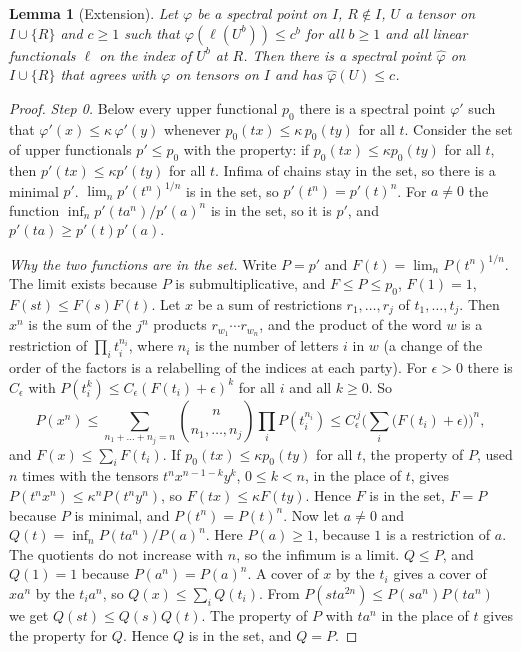 \documentclass[11pt]{article}
\newtheorem{lemma}[theorem]{Lemma}
\theoremstyle{definition}
\begin{document}
\begin{lemma}[Extension]\label{lem:ext}
Let $\varphi$ be a spectral point on $I$, $R\notin I$, $U$ a tensor on $I\cup\{R\}$ and $c\ge1$ such that $\varphi(\ell(U^b))\le c^b$ for all $b\ge1$ and all linear functionals $\ell$ on the index of $U^b$ at $R$. Then there is a spectral point $\hat\varphi$ on $I\cup\{R\}$ that agrees with $\varphi$ on tensors on $I$ and has $\hat\varphi(U)\le c$.
\end{lemma}
\begin{proof}
\emph{Step 0.} Below every upper functional $p_0$ there is a spectral point $\varphi'$ such that $\varphi'(x)\le\kappa\,\varphi'(y)$ whenever $p_0(tx)\le\kappa\,p_0(ty)$ for all $t$. Consider the set of upper functionals $p'\le p_0$ with the property: if $p_0(tx)\le\kappa p_0(ty)$ for all $t$, then $p'(tx)\le\kappa p'(ty)$ for all $t$. Infima of chains stay in the set, so there is a minimal $p'$.
$\lim_np'(t^n)^{1/n}$ is in the set, so $p'(t^n)=p'(t)^n$. For $a\ne0$ the function $\inf_np'(ta^n)/p'(a)^n$ is in the set, so it is $p'$, and $p'(ta)\ge p'(t)p'(a)$.

\emph{Why the two functions are in the set.} Write $P=p'$ and $F(t)=\lim_nP(t^n)^{1/n}$. The limit exists because $P$ is submultiplicative, and $F\le P\le p_0$, $F(1)=1$, $F(st)\le F(s)F(t)$.
Let $x$ be a sum of restrictions $r_1,\dots,r_j$ of $t_1,\dots,t_j$. Then $x^n$ is the sum of the $j^n$ products $r_{w_1}\cdots r_{w_n}$, and the product of the word $w$ is a restriction of $\prod_it_i^{n_i}$, where $n_i$ is the number of letters $i$ in $w$ (a change of the order of the factors is a relabelling of the indices at each party).
For $\epsilon>0$ there is $C_\epsilon$ with $P(t_i^k)\le C_\epsilon(F(t_i)+\epsilon)^k$ for all $i$ and all $k\ge0$. So
\[
P(x^n)\le\sum_{n_1+\dots+n_j=n}\binom n{n_1,\dots,n_j}\prod_iP(t_i^{n_i})\le C_\epsilon^{\,j}\Big(\sum_i\big(F(t_i)+\epsilon\big)\Big)^n ,
\]
and $F(x)\le\sum_iF(t_i)$. If $p_0(tx)\le\kappa p_0(ty)$ for all $t$, the property of $P$, used $n$ times with the tensors $t^nx^{n-1-k}y^k$, $0\le k<n$, in the place of $t$, gives $P(t^nx^n)\le\kappa^nP(t^ny^n)$, so $F(tx)\le\kappa F(ty)$. Hence $F$ is in the set, $F=P$ because $P$ is minimal, and $P(t^n)=P(t)^n$.
Now let $a\ne0$ and $Q(t)=\inf_nP(ta^n)/P(a)^n$. Here $P(a)\ge1$, because $1$ is a restriction of $a$. The quotients do not increase with $n$, so the infimum is a limit. $Q\le P$, and $Q(1)=1$ because $P(a^n)=P(a)^n$. A cover of $x$ by the $t_i$ gives a cover of $xa^n$ by the $t_ia^n$, so $Q(x)\le\sum_iQ(t_i)$. From $P(sta^{2n})\le P(sa^n)P(ta^n)$ we get $Q(st)\le Q(s)Q(t)$. The property of $P$ with $ta^n$ in the place of $t$ gives the property for $Q$. Hence $Q$ is in the set, and $Q=P$.


\end{proof}
\end{document}
